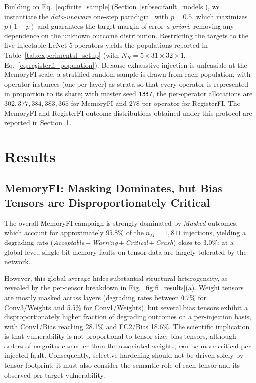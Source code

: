 \documentclass[conference]{IEEEtran}
\begin{document}
Building on Eq.~\eqref{eq:finite_sample} (Section~\ref{subsec:fault_models}), we instantiate the \emph{data-unaware} one-step paradigm~\cite{ruospo2023assessing} with $p=0.5$, which maximizes $p(1-p)$ and guarantees the target margin of error \emph{a priori}, removing any dependence on the unknown outcome distribution. Restricting the targets to the five injectable LeNet-5 operators yields the populations reported in Table~\ref{tab:experimental_setup} (with $N_R = 5\times 31\times 32\times 1$, Eq.~\eqref{eq:registerfi_population}). Because exhaustive injection is unfeasible at the MemoryFI scale, a stratified random sample is drawn from each population, with operator instances (one per layer) as strata so that every operator is represented in proportion to its share; with master seed \texttt{1337}, the per-operator allocations are $302, 377, 384, 383, 365$ for MemoryFI and $278$ per operator for RegisterFI. The MemoryFI and RegisterFI outcome distributions obtained under this protocol are reported in Section~\ref{sec:results}.



\section{Results}
\label{sec:results}



\subsection{MemoryFI: Masking Dominates, but Bias Tensors are Disproportionately Critical}

The overall MemoryFI campaign is strongly dominated by \textit{Masked} outcomes, which account for approximately 96.8\% of the $n_{M}=1{,}811$ injections, yielding a degrading rate (\textit{Acceptable}\,+\,\textit{Warning}\,+\,\textit{Critical}\,+\,\textit{Crash}) close to 3.0\%: at a global level, single-bit memory faults on tensor data are largely tolerated by the network.

However, this global average hides substantial structural heterogeneity, as revealed by the per-tensor breakdown in Fig.~\ref{fig:fi_results}(a). Weight tensors are mostly masked across layers (degrading rates between 0.7\% for Conv3/Weights and 5.6\% for Conv1/Weights), but several bias tensors exhibit a disproportionately higher fraction of degrading outcomes on a per-injection basis, with Conv1/Bias reaching 28.1\% and FC2/Bias 18.6\%. The scientific implication is that vulnerability is not proportional to tensor size: bias tensors, although orders of magnitude smaller than the associated weights, can be more critical per injected fault. Consequently, selective hardening should not be driven solely by tensor footprint; it must also consider the semantic role of each tensor and its observed per-target vulnerability.
\end{document}
